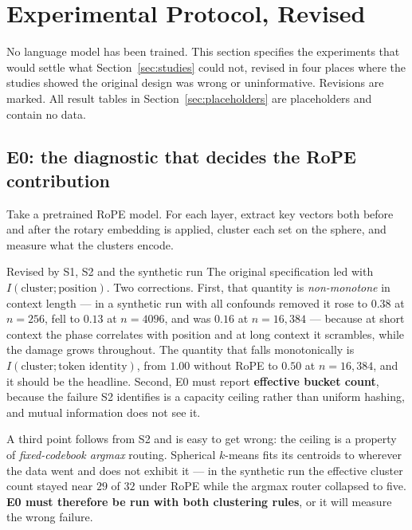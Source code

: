 \section{Experimental Protocol, Revised}
\label{sec:protocol}

No language model has been trained. This section specifies the experiments that would settle what Section~\ref{sec:studies} could not, revised in four places where the studies showed the original design was wrong or uninformative. Revisions are marked. All result tables in Section~\ref{sec:placeholders} are placeholders and contain no data.

\subsection{E0: the diagnostic that decides the RoPE contribution}
\label{sec:e0}

Take a pretrained RoPE model. For each layer, extract key vectors both before and after the rotary embedding is applied, cluster each set on the sphere, and measure what the clusters encode.

\begin{revision}{Revised by S1, S2 and the synthetic run}
The original specification led with $I(\text{cluster};\text{position})$. Two corrections. First, that quantity is \emph{non-monotone} in context length --- in a synthetic run with all confounds removed it rose to $0.38$ at $n = 256$, fell to $0.13$ at $n = 4096$, and was $0.16$ at $n = 16{,}384$ --- because at short context the phase correlates with position and at long context it scrambles, while the damage grows throughout. The quantity that falls monotonically is $I(\text{cluster};\text{token identity})$, from $1.00$ without RoPE to $0.50$ at $n = 16{,}384$, and it should be the headline. Second, E0 must report \textbf{effective bucket count}, because the failure S2 identifies is a capacity ceiling rather than uniform hashing, and mutual information does not see it.

A third point follows from S2 and is easy to get wrong: the ceiling is a property of \emph{fixed-codebook argmax} routing. Spherical $k$-means fits its centroids to wherever the data went and does not exhibit it --- in the synthetic run the effective cluster count stayed near $29$ of $32$ under RoPE while the argmax router collapsed to five. \textbf{E0 must therefore be run with both clustering rules}, or it will measure the wrong failure.
\end{revision}

